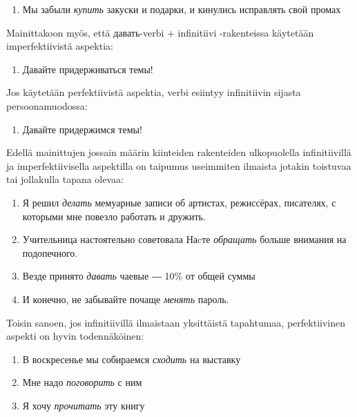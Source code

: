 \documentclass[]{scrartcl}
\providecommand{\tightlist}{%
  \setlength{\itemsep}{0pt}\setlength{\parskip}{0pt}}
\begin{document}
\begin{enumerate}
\def\labelenumi{(\arabic{enumi})}
\setcounter{enumi}{337}
\tightlist
\item
  Мы забыли \emph{купить} закуски и подарки, и кинулись исправлять свой
  промах
\end{enumerate}

Mainittakoon myös, että давать-verbi + infinitiivi -rakenteissa
käytetään imperfektiivistä aspektia:

\begin{enumerate}
\def\labelenumi{(\arabic{enumi})}
\setcounter{enumi}{338}
\tightlist
\item
  Давайте придерживаться темы!
\end{enumerate}

Jos käytetään perfektiivistä aspektia, verbi esiintyy infinitiivin
sijasta persoonamuodossa:

\begin{enumerate}
\def\labelenumi{(\arabic{enumi})}
\setcounter{enumi}{339}
\tightlist
\item
  Давайте придержимся темы!
\end{enumerate}

Edellä mainittujen jossain määrin kiinteiden rakenteiden ulkopuolella
infinitiivillä ja imperfektiivisella aspektilla on taipumus useimmiten
ilmaista jotakin toistuvaa tai jollakulla tapana olevaa:

\begin{enumerate}
\def\labelenumi{(\arabic{enumi})}
\setcounter{enumi}{340}
\tightlist
\item
  Я решил \emph{делать} мемуарные записи об артистах, режиссёрах,
  писателях, с которыми мне повезло работать и дружить.
\item
  Учительница настоятельно советовала Наcте \emph{обращать} больше
  внимания на подопечного.
\item
  Везде принято \emph{давать} чаевые ― 10\% от общей суммы
\item
  И конечно, не забывайте почаще \emph{менять} пароль.
\end{enumerate}

Toisin sanoen, jos infinitiivillä ilmaistaan yksittäistä tapahtumaa,
perfektiivinen aspekti on hyvin todennäköinen:

\begin{enumerate}
\def\labelenumi{(\arabic{enumi})}
\setcounter{enumi}{344}
\tightlist
\item
  В воскресенье мы собираемся \emph{сходить} на выставку
\item
  Мне надо \emph{поговорить} с ним
\item
  Я хочу \emph{прочитать} эту книгу
\end{enumerate}
\end{document}
